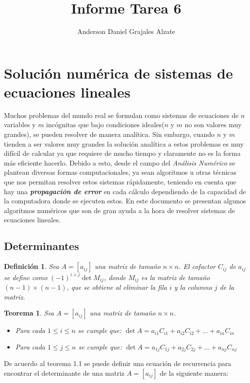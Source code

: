 \documentclass[12pt]{article}
\title{Informe Tarea 6}
\author {Anderson Daniel Grajales Alzate}
\newtheorem{definition}{Definición}[section]
\newtheorem{theorem}{Teorema}[section]
\begin{document}
        \maketitle
        \section{Solución numérica de sistemas de ecuaciones lineales}
        Muchos problemas del mundo real se formulan como sistemas de ecuaciones de $n$ variables y $m$ incógnitas que bajo condiciones ideales($n$ y $m$ no son valores muy grandes), se pueden resolver de manera analítica. Sin embargo, cuando $n$ y $m$ tienden a ser valores muy grandes la solución analítica a estos problemas es muy difícil de calcular ya que requiere de mucho tiempo y claramente no es la forma más eficiente hacerlo. Debido a esto, desde el campo del \textit{Análisis Numérico} se plantean diversas formas computacionales, ya sean algoritmos u otras técnicas que nos permitan resolver estos sistemas rápidamente, teniendo en cuenta que hay una \textit{\textbf{propagación de error}} en cada cálculo dependiendo de la capacidad de la computadora donde se ejecuten estos.
        En este documento se presentan algunos algoritmos numéricos que son de gran ayuda a la hora de resolver sistemas de ecuaciones lineales.
        \subsection{Determinantes}
        \begin{definition}
            Sea $A = [a_{ij}]$ una matriz de tamaño $n \times n$. El cofactor $C_{ij}$ de $a_{ij}$ se define como $(-1)^{i+j}\det {M_{ij}}$, donde $M_{ij}$ es la matriz de tamaño $(n - 1) \times (n - 1)$, que se obtiene al eliminar la fila $i$ y la columna $j$ de la matriz.\cite{algebralineal}
        \end{definition}
        \begin{theorem}
            Sea $A=[a_{ij}]$ una matriz de tamaño $n \times n$. \cite{algebralineal}
            \begin{itemize}
                \item Para cada $1\leq i \leq n$ se cumple que:
                $\det {A} = a_{i1}C_{i1} + a_{i2}C_{i2} + ... + a_{in}C_{in}$
                \item Para cada $1\leq j \leq n$ se cumple que:
                $\det {A} = a_{1j}C_{1j} + a_{2j}C_{2j} + ... + a_{nj}C_{nj}$
            \end{itemize}
        \end{theorem}
        De acuerdo al teorema 1.1 se puede definir una ecuación de recurrencia para encontrar el determinante de una matriz $A = [a_{ij}]$ de la siguiente manera:
        
\end{document}
